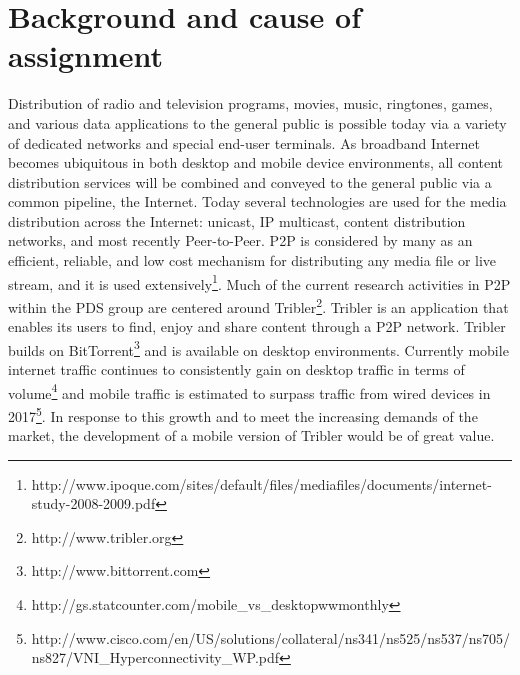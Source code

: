 \section{Background and cause of assignment}
Distribution of radio and television programs, movies, music, ringtones, games, and various data applications to the general public is possible today via a variety of dedicated networks and special end-user terminals. As broadband Internet becomes ubiquitous in both desktop and mobile device environments, all content distribution services will be combined and conveyed to the general public via a common pipeline, the Internet. Today several technologies are used for the media distribution across the Internet: unicast, IP multicast, content distribution networks, and most recently Peer-to-Peer. P2P is considered by many as an efficient, reliable, and low cost mechanism for distributing any media file or live stream, and it is used extensively\footnote{http://www.ipoque.com/sites/default/files/mediafiles/documents/internet-study-2008-2009.pdf}. Much of the current research activities in P2P within the PDS group are centered around Tribler\footnote{http://www.tribler.org}. Tribler is an application that enables its users to find, enjoy and share content through a P2P network. Tribler builds on BitTorrent\footnote{http://www.bittorrent.com} and is available on desktop environments. Currently mobile internet traffic continues to consistently gain on desktop traffic in terms of volume\footnote{http://gs.statcounter.com/mobile\_vs\_desktop\-ww\-monthly} and mobile traffic is estimated to surpass traffic from wired devices in 2017\footnote{http://www.cisco.com/en/US/solutions/collateral/ns341/ns525/ns537/ns705/ns827/VNI\_Hyperconnectivity\_WP.pdf}. In response to this growth and to meet the increasing demands of the market, the development of a mobile version of Tribler would be of great value. 
